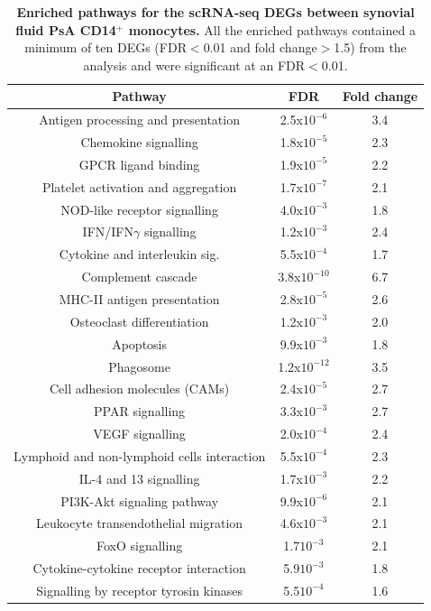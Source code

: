\begin{table}[htbp]
\renewcommand{\arraystretch}{0.7}
\centering
\begin{tabular}{@{}c c c}
\toprule
\textbf{Pathway} & \textbf{FDR} & \textbf{Fold change} \\
\midrule
Antigen processing and presentation          & 2.5x$10^{-6}$  & 3.4 \\
Chemokine signalling                         & 1.8x$10^{-5}$  & 2.3 \\
GPCR ligand binding                          & 1.9x$10^{-5}$  & 2.2 \\
Platelet activation and aggregation          & 1.7x$10^{-7}$  & 2.1 \\
NOD-like receptor signalling                 & 4.0x$10^{-3}$  & 1.8 \\
IFN/IFN$\gamma$ signalling                   &1.2x$10^{-3}$   &2.4  \\
Cytokine and interleukin sig.         			 &5.5x$10^{-4}$   &1.7  \\
Complement cascade                           &3.8x$10^{-10}$  &6.7  \\
MHC-II antigen presentation                  &2.8x$10^{-5}$   &2.6  \\
Osteoclast differentiation                   &1.2x$10^{-3}$   &2.0  \\
Apoptosis                                    &9.9x$10^{-3}$   &1.8  \\
Phagosome                                    &1.2x$10^{-12}$  &3.5  \\
Cell adhesion molecules (CAMs)               &2.4x$10^{-5}$   &2.7  \\
PPAR signalling                              &3.3x$10^{-3}$   &2.7  \\
VEGF signalling                              &2.0x$10^{-4}$   &2.4  \\
Lymphoid and non-lymphoid cells interaction  &5.5x$10^{-4}$   &2.3  \\
IL-4 and 13 signalling                       &1.7x$10^{-3}$   &2.2  \\
PI3K-Akt signaling pathway                   &9.9x$10^{-6}$   &2.1  \\
Leukocyte transendothelial migration         &4.6x$10^{-3}$   &2.1  \\
FoxO signalling                              &1.7$10^{-3}$    &2.1  \\
Cytokine-cytokine receptor interaction       &5.9$10^{-3}$    &1.8  \\
Signalling by receptor tyrosin kinases       &5.5$10^{-4}$    &1.6  \\
\bottomrule
\end{tabular}
\caption[Enriched pathways for the scRNA-seq DEGs between synovial fluid PsA CD14$^+$ monocytes.]{\textbf{Enriched pathways for the scRNA-seq DEGs between synovial fluid PsA CD14$^+$ monocytes.} All the enriched pathways contained a minimum of ten DEGs (FDR$<$0.01 and fold change$>$1.5) from the analysis and were significant at an FDR$<$0.01.}
\label{tab:PSA_scRNAseq_enriched_pathways}
\end{table}


